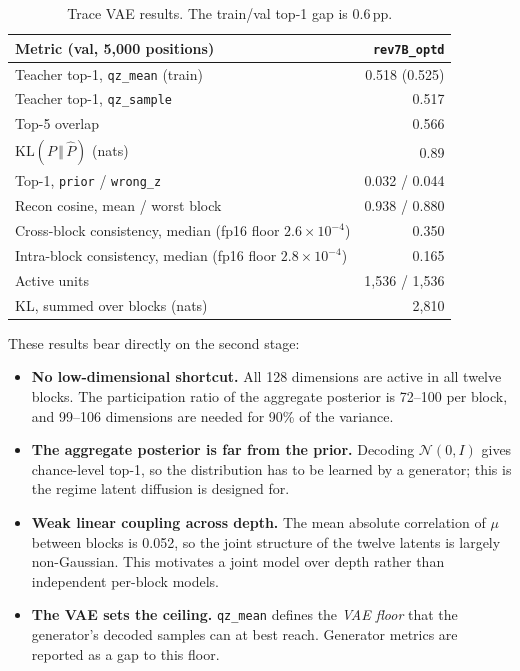 \documentclass[11pt]{article}
\newcommand{\KL}{\mathrm{KL}}
\newcommand{\N}{\mathcal{N}}
\begin{document}
\begin{table}[h]
  \centering\small
  \begin{tabular}{@{}lr@{}}
    \toprule
    Metric (val, 5{,}000 positions) & \texttt{rev7B\_optd} \\
    \midrule
    Teacher top-1, \texttt{qz\_mean} (train) & 0.518 (0.525) \\
    Teacher top-1, \texttt{qz\_sample} & 0.517 \\
    Top-5 overlap & 0.566 \\
    $\KL(P\,\Vert\,\hat P)$ (nats) & 0.89 \\
    Top-1, \texttt{prior} / \texttt{wrong\_z} & 0.032 / 0.044 \\
    Recon cosine, mean / worst block & 0.938 / 0.880 \\
    Cross-block consistency, median (fp16 floor $2.6\times10^{-4}$) & 0.350 \\
    Intra-block consistency, median (fp16 floor $2.8\times10^{-4}$) & 0.165 \\
    Active units & 1{,}536 / 1{,}536 \\
    KL, summed over blocks (nats) & 2{,}810 \\
    \bottomrule
  \end{tabular}
  \caption{Trace VAE results. The train/val top-1 gap is 0.6\,pp.}
  \label{tab:vae-results}
\end{table}

These results bear directly on the second stage:
\begin{itemize}[leftmargin=1.5em]
  \item \textbf{No low-dimensional shortcut.} All 128 dimensions are active in all twelve blocks. The participation ratio of
    the aggregate posterior is 72--100 per block, and 99--106 dimensions are needed for 90\% of the variance.
  \item \textbf{The aggregate posterior is far from the prior.} Decoding $\N(0,I)$ gives chance-level top-1, so the
    distribution has to be learned by a generator; this is the regime latent diffusion is designed for.
  \item \textbf{Weak linear coupling across depth.} The mean absolute correlation of $\mu$ between blocks is 0.052, so the
    joint structure of the twelve latents is largely non-Gaussian. This motivates a joint model over depth rather than
    independent per-block models.
  \item \textbf{The VAE sets the ceiling.} \texttt{qz\_mean} defines the \emph{VAE floor} that the generator's decoded
    samples can at best reach. Generator metrics are reported as a gap to this floor.
\end{itemize}
\end{document}

